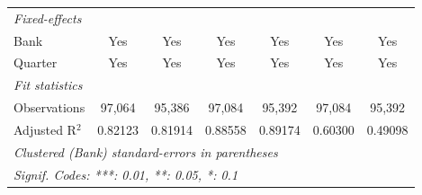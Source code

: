 \begin{tabular}{lcccccc}
   \midrule
   \emph{Fixed-effects}\\
   Bank                           & Yes             & Yes             & Yes            & Yes            & Yes                   & Yes\\  
   Quarter                        & Yes             & Yes             & Yes            & Yes            & Yes                   & Yes\\  
   \midrule
   \emph{Fit statistics}\\
   Observations                   & 97,064          & 95,386          & 97,084         & 95,392         & 97,084                & 95,392\\  
   Adjusted R$^2$                 & 0.82123         & 0.81914         & 0.88558        & 0.89174        & 0.60300               & 0.49098\\  
   \midrule \midrule
   \multicolumn{7}{l}{\emph{Clustered (Bank) standard-errors in parentheses}}\\
   \multicolumn{7}{l}{\emph{Signif. Codes: ***: 0.01, **: 0.05, *: 0.1}}\\
\end{tabular}
\par\endgroup



